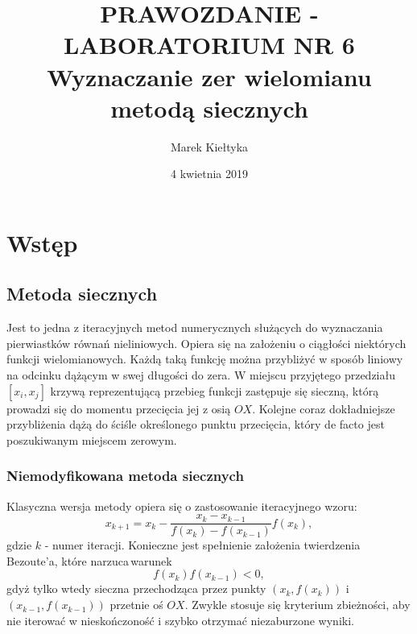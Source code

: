

\renewcommand{\arraystretch}{1.2}

\title{\Large\vspace{-2.5cm}{\Huge S}PRAWOZDANIE - LABORATORIUM NR {\Huge6}\\
		\textbf{Wyznaczanie zer wielomianu metodą siecznych} } 
\date{\Large4 kwietnia 2019}
\author{\Large Marek Kiełtyka}


\maketitle

\vspace{-1.2cm}\section{Wstęp}
	
\subsection{Metoda siecznych}

Jest to jedna z iteracyjnych metod numerycznych służących do wyznaczania pierwiastków równań nieliniowych. Opiera się na założeniu o ciągłości niektórych funkcji wielomianowych. Każdą taką funkcję można przybliżyć w sposób liniowy na odcinku dążącym w swej długości do zera. W miejscu przyjętego przedziału $ [x_i, x_j] $ krzywą reprezentującą przebieg funkcji zastępuje się sieczną, którą prowadzi się do momentu przecięcia jej z osią $ OX $. Kolejne coraz dokładniejsze przybliżenia dążą do ściśle określonego punktu przecięcia, który de facto jest poszukiwanym miejscem zerowym.
\subsubsection{Niemodyfikowana metoda siecznych}

Klasyczna wersja metody opiera się o zastosowanie iteracyjnego wzoru:
\begin{equation}
x_{k+1} = x_k - \frac{x_k - x_{k-1}}{f(x_k) - f(x_{k-1})}f(x_k),
\label{iter}
\end{equation}
gdzie $ k $ - numer iteracji. Konieczne jest spełnienie założenia twierdzenia Bezoute'a, które narzuca\,warunek
\begin{equation}
f(x_{k})f(x_{k-1}) < 0, 
\end{equation}
gdyż tylko wtedy sieczna przechodząca przez punkty $ (x_k, f(x_k)) $  i $ (x_{k-1},f(x_{k-1})) $ przetnie oś $ OX $. Zwykle stosuje się kryterium zbieżności, aby nie iterować w nieskończoność i szybko otrzymać niezaburzone wyniki.

